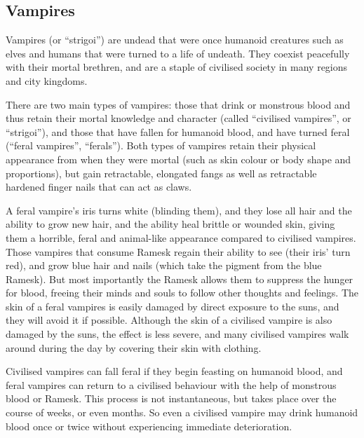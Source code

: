 \ifimages
\clearpage
{}
\clearpage
\fi

\subsection{Vampires}
\label{sec:Vampires}

Vampires (or ``strigoi'') are undead that were once humanoid creatures such as
elves and humans that were turned to a life of undeath. They coexist
peacefully with their mortal brethren, and are a staple of civilised society
in many regions and city kingdoms.

There are two main types of vampires: those that drink  or
monstrous blood and thus retain their mortal knowledge and character (called
``civilised vampires'', or ``strigoi''), and those that have fallen for
humanoid blood, and have turned feral (``feral vampires'', ``ferals''). Both
types of vampires retain their physical appearance from when they were mortal
(such as skin colour or body shape and proportions), but gain retractable,
elongated fangs as well as retractable hardened finger nails that can act as
claws.

A feral vampire's iris turns white (blinding them), and they lose all hair and
the ability to grow new hair, and the ability heal brittle or wounded skin,
giving them a horrible, feral and animal-like appearance compared to civilised
vampires. Those vampires that consume Ramesk regain their ability to see
(their iris' turn red), and grow blue hair and nails (which take the pigment
from the blue Ramesk). But most importantly the Ramesk allows them to suppress
the hunger for blood, freeing their minds and souls to follow other thoughts
and feelings. The skin of a feral vampires is easily damaged by direct
exposure to the suns, and they will avoid it if possible. Although the skin of
a civilised vampire is also damaged by the suns, the effect is less severe,
and many civilised vampires walk around during the day by covering their skin
with clothing.

Civilised vampires can fall feral if they begin feasting on humanoid blood,
and feral vampires can return to a civilised behaviour with the help of
monstrous blood or Ramesk. This process is not instantaneous, but takes place
over the course of weeks, or even months. So even a civilised vampire may
drink humanoid blood once or twice without experiencing immediate
deterioration.

